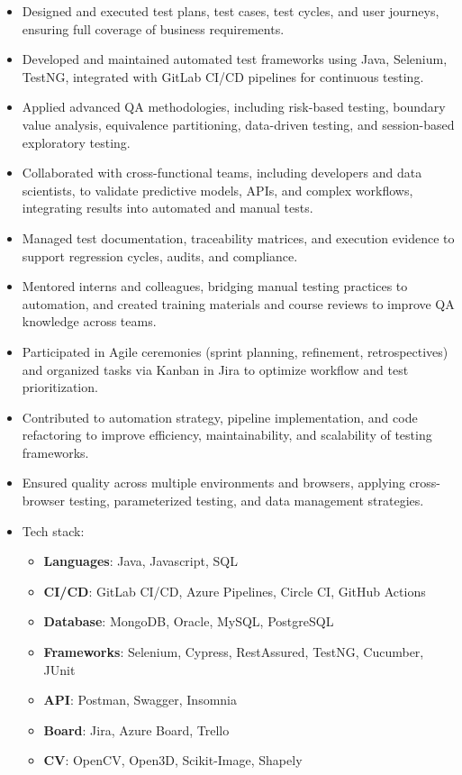 
{\small
{}
\begin{itemize}
    \item Designed and executed test plans, test cases, test cycles, and user journeys, ensuring full coverage of business requirements.
    \item Developed and maintained automated test frameworks using Java, Selenium, TestNG, integrated with GitLab CI/CD pipelines for continuous testing.
    \item Applied advanced QA methodologies, including risk-based testing, boundary value analysis, equivalence partitioning, data-driven testing, and session-based exploratory testing.
    \item Collaborated with cross-functional teams, including developers and data scientists, to validate predictive models, APIs, and complex workflows, integrating results into automated and manual tests.
    \item Managed test documentation, traceability matrices, and execution evidence to support regression cycles, audits, and compliance.
    \item Mentored interns and colleagues, bridging manual testing practices to automation, and created training materials and course reviews to improve QA knowledge across teams.
    \item Participated in Agile ceremonies (sprint planning, refinement, retrospectives) and organized tasks via Kanban in Jira to optimize workflow and test prioritization.
    \item Contributed to automation strategy, pipeline implementation, and code refactoring to improve efficiency, maintainability, and scalability of testing frameworks.
    \item Ensured quality across multiple environments and browsers, applying cross-browser testing, parameterized testing, and data management strategies.
    \item Tech stack:
    \begin{itemize}
        \item \textbf{Languages}: {\color{accent2}Java, Javascript, SQL}
        \item \textbf{CI/CD}: {\color{accent2}GitLab CI/CD, Azure Pipelines, Circle CI, GitHub Actions}
        \item \textbf{Database}: {\color{accent2}MongoDB, Oracle, MySQL, PostgreSQL}
        \item \textbf{Frameworks}: {\color{accent2}Selenium, Cypress, RestAssured, TestNG, Cucumber, JUnit}
        \item \textbf{API}: {\color{accent2}Postman, Swagger, Insomnia}
        \item \textbf{Board}: {\color{accent2}Jira, Azure Board, Trello}
        \item \textbf{CV}: {\color{accent2}OpenCV, Open3D, Scikit-Image, Shapely}
    \end{itemize}
\end{itemize}

}
